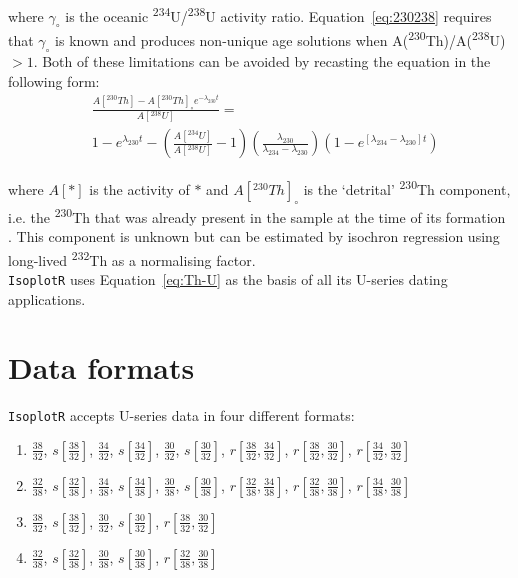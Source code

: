 \begin{refsection}
\noindent where $\gamma_\circ$ is the oceanic
\textsuperscript{234}U/\textsuperscript{238}U activity ratio.
Equation~\ref{eq:230238} requires that $\gamma_\circ$ is known and
produces non-unique age solutions when
A(\textsuperscript{230}Th)/A(\textsuperscript{238}U)$>1$. Both of
these limitations can be avoided by recasting the equation in the
following form:
\begin{equation}
  \begin{split}
  & \frac{A[{}^{230}Th] - A[{}^{230}Th]_{\circ}e^{-\lambda_{230}t}}{A[{}^{238}U]} = \\
  & 1 - e^{\lambda_{230}t} -
  \left(\frac{A[{}^{234}U]}{A[{}^{238}U]}-1\right)
  \left(\frac{\lambda_{230}}{\lambda_{234}-\lambda_{230}}\right)
  \left(1-e^{[\lambda_{234}-\lambda_{230}]t}\right)
  \end{split}
  \label{eq:Th-U}
\end{equation}

\noindent where $A[\ast]$ is the activity of $\ast$ and
$A[{}^{230}Th]_\circ$ is the `detrital' \textsuperscript{230}Th
component, i.e. the \textsuperscript{230}Th that was already present
in the sample at the time of its formation \citep{kaufman1965,
  ludwig2003b}. This component is unknown but can be estimated by
isochron regression using long-lived \textsuperscript{232}Th as a
normalising factor.\\

\texttt{IsoplotR} uses Equation~\ref{eq:Th-U} as the basis of all its
U-series dating applications.

\section{Data formats}\label{sec:ThUformats}

\texttt{IsoplotR} accepts U-series data in four different formats:

\begin{enumerate}
\item $\frac{38}{32}$, $s\!\left[\frac{38}{32}\right]$,
  $\frac{34}{32}$, $s\!\left[\frac{34}{32}\right]$,
  $\frac{30}{32}$, $s\!\left[\frac{30}{32}\right]$,
  $r\!\left[\frac{38}{32},\frac{34}{32}\right]$,
  $r\!\left[\frac{38}{32},\frac{30}{32}\right]$,
  $r\!\left[\frac{34}{32},\frac{30}{32}\right]$
\item $\frac{32}{38}$, $s\!\left[\frac{32}{38}\right]$,
  $\frac{34}{38}$, $s\!\left[\frac{34}{38}\right]$,
  $\frac{30}{38}$, $s\!\left[\frac{30}{38}\right]$,
  $r\!\left[\frac{32}{38},\frac{34}{38}\right]$,
  $r\!\left[\frac{32}{38},\frac{30}{38}\right]$,
  $r\!\left[\frac{34}{38},\frac{30}{38}\right]$
\item $\frac{38}{32}$, $s\!\left[\frac{38}{32}\right]$,
  $\frac{30}{32}$, $s\!\left[\frac{30}{32}\right]$,
  $r\!\left[\frac{38}{32},\frac{30}{32}\right]$
\item $\frac{32}{38}$, $s\!\left[\frac{32}{38}\right]$,
  $\frac{30}{38}$, $s\!\left[\frac{30}{38}\right]$,
  $r\!\left[\frac{32}{38},\frac{30}{38}\right]$
\end{enumerate}


\end{refsection}
